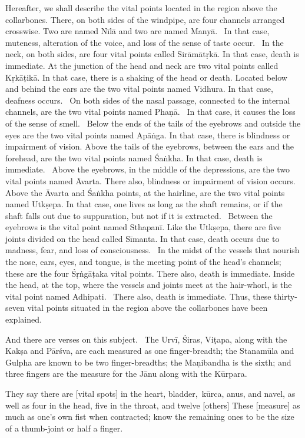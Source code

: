 \begin{translation}
\begin{tt}
Hereafter, we shall describe the vital points located in the region above the collarbones.
There, on both sides of the windpipe, are four channels arranged crosswise.
Two are named Nīlā and two are named Manyā. 
In that case, muteness, alteration of the voice, and loss of the sense of taste occur. 
In the neck, on both sides, are four vital points called Sirāmātṛkā.
In that case, death is immediate.
At the junction of the head and neck are two vital points called Kṛkāṭikā.
In that case, there is a shaking of the head or death.
Located below and behind the ears are the two vital points named Vidhura.
In that case, deafness occurs. 
On both sides of the nasal passage, connected to the internal channels, are the two vital points named Phaṇā. 
In that case, it causes the loss of the sense of smell. 
Below the ends of the tails of the eyebrows and outside the eyes are the two vital points named Apāṅga.
In that case, there is blindness or impairment of vision.
Above the tails of the eyebrows, between the ears and the forehead, are the two vital points named Śaṅkha.
In that case, death is immediate. 
Above the eyebrows, in the middle of the depressions, are the two vital points named Āvarta.
There also, blindness or impairment of vision occurs. 
Above the Āvarta and Śaṅkha points, at the hairline, are the two vital points named Utkṣepa.
In that case, one lives as long as the shaft remains, or if the shaft falls out due to suppuration, but not if it is extracted. 
Between the eyebrows is the vital point named Sthapanī.
Like the Utkṣepa, there are five joints divided on the head called Sīmanta.
In that case, death occurs due to madness, fear, and loss of consciousness. 
In the midst of the vessels that nourish the nose, ears, eyes, and tongue, is the meeting point of the head's channels; these are the four Śṛṅgāṭaka vital points.
There also, death is immediate.
Inside the head, at the top, where the vessels and joints meet at the hair-whorl, is the vital point named Adhipati. 
There also, death is immediate.
Thus, these thirty-seven vital points situated in the region above the collarbones have been explained.


\item[28]
And there are verses on this subject. 
The Urvī, Śiras, Viṭapa, along with the Kakṣa and Pārśva, are each measured as one finger-breadth; the Stanamūla and Gulpha are known to be two finger-breadths; the Maṇibandha is the sixth; and three fingers are the measure for the Jānu along with the Kūrpara.

\item[29]
They say there are [vital spots] in the heart, bladder, kūrca, anus, and navel, as well as four in the head, five in the throat, and twelve [others] These [measure] as much as one's own fist when contracted; know the remaining ones to be the size of a thumb-joint or half a finger.


\end{tt}
\end{translation}
